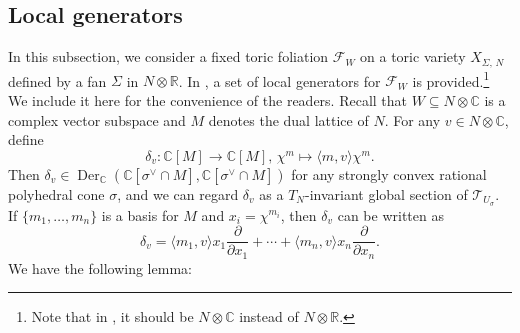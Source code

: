 \documentclass[12pt,reqno]{amsart}
\theoremstyle{definition}
\newcommand{\mc}{\mathcal}
\newcommand{\mb}{\mathbb}
\newcommand{\on}{\operatorname}
\newcommand\cF{{\mathcal{F}}}
\newcommand\cT{{\mathcal{T}}}
\newcommand\bC{{\mathbb C}}
\newcommand\bR{{\mathbb R}}
\begin{document}
\subsection{Local generators}\label{loc_generator}
In this subsection, we consider a fixed toric foliation $\mc F_W$ on a toric variety $X_{\Sigma,\,N}$ defined by a fan $\Sigma$ in $N\otimes\bR$. In \cite{pang2015harder}, a set of local generators for $\cF_W$ is provided.\footnote{Note that in \cite{pang2015harder}, it should be $N\otimes\bC$ instead of $N\otimes\bR$.} We include it here for the convenience of the readers. 
Recall that $W\subseteq N\otimes\bC$ is a complex vector subspace and $M$ denotes the dual lattice of $N$.  For any $v\in N\otimes\bC$, define
\[
\delta_v\colon \mb C[M]\rightarrow \mb C[M],\, \chi^m\mapsto \langle m,v \rangle\chi^m.
\]
Then $\delta_v\in\on{Der}_{\mb C}(\mb C[\sigma^\vee\cap M],\mb C[\sigma^\vee\cap M])$ for any strongly convex rational polyhedral cone $\sigma$, and we can regard $\delta_v$ as a $T_N$-invariant global section of $\cT_{U_\sigma}$.
If $\{m_1,\ldots,m_n\}$ is a basis for $M$ and $x_i=\chi^{m_i}$, then $\delta_v$ can be written as 
\[
    \delta_v=\langle m_1,v\rangle x_1\frac{\partial}{\partial x_1}+\cdots+\langle m_n,v\rangle x_n\frac{\partial}{\partial x_n}.
\]
We have the following lemma:
\end{document}
